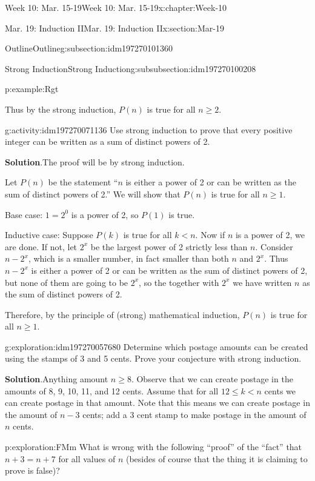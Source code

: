 \documentclass[oneside,10pt,]{book}
\newcommand{\blocktitlefont}{\relax}
\numberwithin{equation}{section}
\renewcommand{\le}{\leqslant}
\renewcommand{\ge}{\geqslant}
\newcommand{\lt}{<}
\begin{document}
\begin{chapterptx}{Week 10: Mar. 15-19}{}{Week 10: Mar. 15-19}{}{}{x:chapter:Week-10}
\begin{sectionptx}{Mar. 19: Induction II}{}{Mar. 19: Induction II}{}{}{x:section:Mar-19}
\begin{subsectionptx}{Outline}{}{Outline}{}{}{g:subsection:idm197270101360}
\begin{subsubsectionptx}{Strong Induction}{}{Strong Induction}{}{}{g:subsubsection:idm197270100208}
\begin{example}{}{p:example:Rgt}
\par
Thus by the strong induction, \(P(n)\) is true for all \(n \ge 2\).%
\end{example}
\begin{activity}{}{g:activity:idm197270071136}%
Use strong induction to prove that every positive integer can be written as a sum of distinct powers of 2.%
\par\smallskip%
\noindent\textbf{\blocktitlefont Solution}.\hypertarget{p:solution:DBA}{}\quad{}The proof will be by strong induction.%
\begin{solutionproof}
Let \(P(n)\) be the statement ``\(n\) is either a power of 2 or can be written as the sum of distinct powers of 2.'' We will show that \(P(n)\) is true for all \(n \ge 1\).%
\par
Base case: \(1 = 2^0\) is a power of 2, so \(P(1)\) is true.%
\par
Inductive case: Suppose \(P(k)\) is true for all \(k \lt n\). Now if \(n\) is a power of 2, we are done. If not, let \(2^x\) be the largest power of 2 strictly less than \(n\). Consider \(n - 2^x\), which is a smaller number, in fact smaller than both \(n\) and \(2^x\). Thus \(n-2^x\) is either a power of 2 or can be written as the sum of distinct powers of 2, but none of them are going to be \(2^x\), so the together with \(2^x\) we have written \(n\) as the sum of distinct powers of 2.%
\par
Therefore, by the principle of (strong) mathematical induction, \(P(n)\) is true for all \(n \ge 1\).%
\end{solutionproof}
\end{activity}%
\begin{exploration}{}{g:exploration:idm197270057680}%
Determine which postage amounts can be created using the stamps of 3 and 5 cents. Prove your conjecture with strong induction.%
\par\smallskip%
\noindent\textbf{\blocktitlefont Solution}.\hypertarget{g:solution:idm197270057008}{}\quad{}Anything amount \(n\ge 8\). Observe that we can create postage in the amounts of 8, 9, 10, 11, and 12 cents. Assume that for all \(12 \le k \lt n\) cents we can create postage in that amount. Note that this means we can create postage in the amount of \(n-3\) cents; add a 3 cent stamp to make postage in the amount of \(n\) cents.%
\end{exploration}%
\begin{exploration}{}{p:exploration:FMm}%
What is wrong with the following ``proof'' of the ``fact'' that \(n+3 = n+7\) for all values of \(n\) (besides of course that the thing it is claiming to prove is false)?%

\end{exploration}
\end{subsubsectionptx}
\end{subsectionptx}
\end{sectionptx}
\end{chapterptx}
\end{document}
